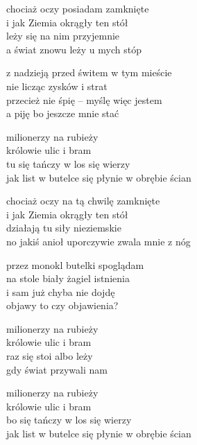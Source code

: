 \begin{text}
    chociaż oczy posiadam zamknięte\\
    i jak Ziemia okrągły ten stół\\
    leży się na nim przyjemnie\\
    a świat znowu leży u mych stóp

    z nadzieją przed świtem w tym mieście\\
    nie licząc zysków i strat\\
    przecież nie śpię – myślę więc jestem\\
    a piję bo jeszcze mnie stać

    \vin milionerzy na rubieży\\
    \vin królowie ulic i bram\\
    \vin tu się tańczy w los się wierzy\\
    \vin jak list w butelce się płynie w obrębie ścian

    chociaż oczy na tą chwilę zamknięte\\
    i jak Ziemia okrągły ten stół\\
    działają tu siły nieziemskie\\
    no jakiś anioł uporczywie zwala mnie z nóg

    przez monokl butelki spoglądam\\
    na stole biały żagiel istnienia\\
    i sam już chyba nie dojdę\\
    objawy to czy objawienia?

    \vin milionerzy na rubieży\\
    \vin królowie ulic i bram\\
    \vin raz się stoi albo leży\\
    \vin gdy świat przywali nam

    \vin milionerzy na rubieży\\
    \vin królowie ulic i bram\\
    \vin bo się tańczy w los się wierzy\\
    \vin jak list w butelce się płynie w obrębie ścian
\end{text}
\begin{chord}

\end{chord}